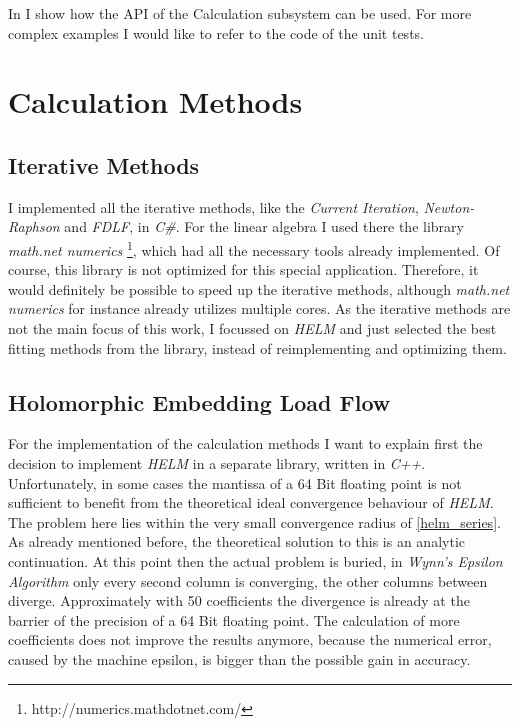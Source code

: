 In  I show how the API of the Calculation subsystem can be used. For more complex examples I would like to refer to the code of the unit tests.

\section{Calculation Methods}
\label{sec:implementation_calculation_methods}

\subsection{Iterative Methods}
I implemented all the iterative methods, like the \emph{Current Iteration}, \emph{Newton-Raphson} and \emph{FDLF}, in \emph{C\#}. For the linear algebra I used there the library \emph{math.net numerics} \footnote{http://numerics.mathdotnet.com/}, which had all the necessary tools already implemented. Of course, this library is not optimized for this special application. Therefore, it would definitely be possible to speed up the iterative methods, although \emph{math.net numerics} for instance already utilizes multiple cores. As the iterative methods are not the main focus of this work, I focussed on \emph{HELM} and just selected the best fitting methods from the library, instead of reimplementing and optimizing them.

\subsection{Holomorphic Embedding Load Flow}
\label{sec:implementation_helm}
For the implementation of the calculation methods I want to explain first the decision to implement \emph{HELM} in a separate library, written in \emph{C++}. Unfortunately, in some cases the mantissa of a 64 Bit floating point is not sufficient to benefit from the theoretical ideal convergence behaviour of \emph{HELM}. The problem here lies within the very small convergence radius of \eqref{helm_series}. As already mentioned before, the theoretical solution to this is an analytic continuation. At this point then the actual problem is buried, in \emph{Wynn's Epsilon Algorithm} only every second column is converging, the other columns between diverge. Approximately with 50 coefficients the divergence is already at the barrier of the precision of a 64 Bit floating point. The calculation of more coefficients does not improve the results anymore, because the numerical error, caused by the machine epsilon, is bigger than the possible gain in accuracy.

